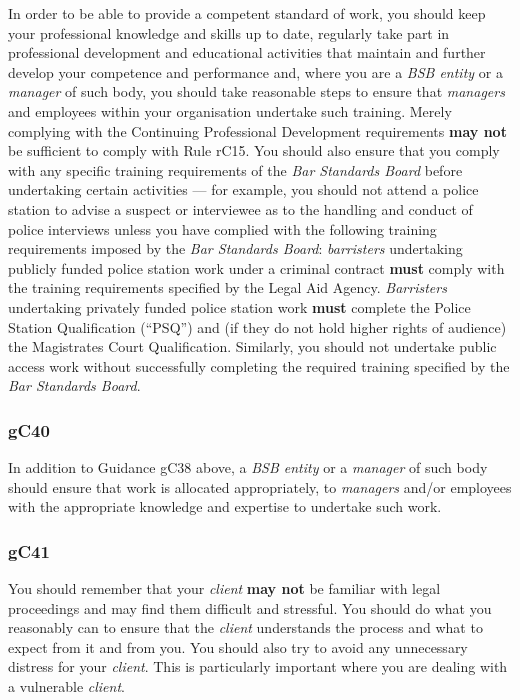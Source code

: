 In order to be able to provide a competent standard of work, you should
keep your professional knowledge and skills up to date, regularly take
part in professional development and educational activities that
maintain and further develop your competence and performance and, where
you are a \emph{BSB entity} or a \emph{manager} of such body, you should
take reasonable steps to ensure that \emph{managers} and employees
within your organisation undertake such training. Merely complying with
the Continuing Professional Development requirements \textcolor{myred}{\textbf{may not}} be
sufficient to comply with Rule rC15. You should also ensure that you
comply with any specific training requirements of the \emph{Bar
Standards Board} before undertaking certain activities — for example,
you should not attend a police station to advise a suspect or
interviewee as to the handling and conduct of police interviews unless
you have complied with the following training requirements imposed by
the \emph{Bar Standards Board}: \emph{barristers} undertaking publicly
funded police station work under a criminal contract \textcolor{myred}{\textbf{must}} comply with
the training requirements specified by the Legal Aid Agency.
\emph{Barristers} undertaking privately funded police station work \textcolor{myred}{\textbf{must}}
complete the Police Station Qualification (``PSQ'') and (if they do not
hold higher rights of audience) the Magistrates Court Qualification.
Similarly, you should not undertake public access work without
successfully completing the required training specified by the \emph{Bar
Standards Board}.

\subsubsection{\color{darkgrey}gC40}

In addition to Guidance gC38 above, a \emph{BSB entity} or a
\emph{manager} of such body should ensure that work is allocated
appropriately, to \emph{managers} and/or employees with the appropriate
knowledge and expertise to undertake such work.

\subsubsection{\color{darkgrey}gC41}

You should remember that your \emph{client} \textcolor{myred}{\textbf{may not}} be familiar with
legal proceedings and may find them difficult and stressful. You should
do what you reasonably can to ensure that the \emph{client} understands
the process and what to expect from it and from you. You should also try
to avoid any unnecessary distress for your \emph{client}. This is
particularly important where you are dealing with a vulnerable
\emph{client}.

